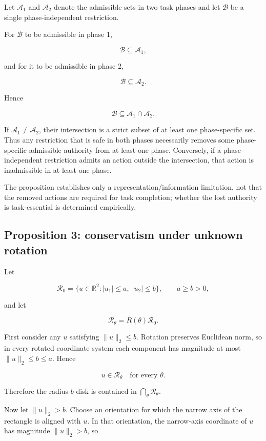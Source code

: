 \documentclass[10pt]{article}
\begin{document}
Let $\mathcal{A}_1$ and $\mathcal{A}_2$ denote the admissible sets in two task
phases and let $\mathcal{B}$ be a single phase-independent restriction.

For $\mathcal{B}$ to be admissible in phase 1,

\[
\mathcal{B}\subseteq\mathcal{A}_1,
\]

and for it to be admissible in phase 2,

\[
\mathcal{B}\subseteq\mathcal{A}_2.
\]

Hence

\[
\mathcal{B}
\subseteq
\mathcal{A}_1\cap\mathcal{A}_2 .
\]

If $\mathcal{A}_1\neq\mathcal{A}_2$, their intersection is a strict subset of
at least one phase-specific set. Thus any restriction that is safe in both
phases necessarily removes some phase-specific admissible authority from at
least one phase. Conversely, if a phase-independent restriction admits an
action outside the intersection, that action is inadmissible in at least one
phase.

The proposition establishes only a representation/information limitation,
not that the removed actions are required for task completion; whether the
lost authority is task-essential is determined empirically.


\subsection*{Proposition 3: conservatism under unknown rotation}

Let

\[
\mathcal{R}_0
=
\{u\in\mathbb{R}^{2}:
|u_1|\leq a,\;
|u_2|\leq b\},
\qquad
a\geq b>0,
\]

and let

\[
\mathcal{R}_{\theta}
=
R(\theta)\mathcal{R}_0 .
\]

First consider any $u$ satisfying $\lVert u\rVert_2\leq b$. Rotation preserves
Euclidean norm, so in every rotated coordinate system each component has
magnitude at most $\lVert u\rVert_2\leq b\leq a$. Hence

\[
u\in\mathcal{R}_{\theta}
\quad
\text{for every }\theta.
\]

Therefore the radius-$b$ disk is contained in
$\bigcap_{\theta}\mathcal{R}_{\theta}$.

Now let $\lVert u\rVert_2>b$. Choose an orientation for which the narrow axis
of the rectangle is aligned with $u$. In that orientation, the narrow-axis
coordinate of $u$ has magnitude $\lVert u\rVert_2>b$, so
\end{document}
